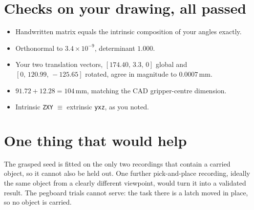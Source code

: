 \documentclass[10pt,a4paper]{article}
\begin{document}
\section{Checks on your drawing, all passed}
\begin{itemize}\itemsep0pt \parskip0pt 
\item Handwritten matrix equals the intrinsic composition of your angles exactly.
\item Orthonormal to $3.4\times10^{-9}$, determinant $1.000$.
\item Your two translation vectors, $[174.40,\,3.3,\,0]$ global and $[0,\,120.99,\,-125.65]$ rotated,
      agree in magnitude to $0.0007$\,mm.
\item $91.72 + 12.28 = 104$\,mm, matching the CAD gripper-centre dimension.
\item Intrinsic \texttt{ZXY} $\equiv$ extrinsic \texttt{yxz}, as you noted.
\end{itemize}

\section{One thing that would help}
The grasped seed is fitted on the only two recordings that contain a carried object, so it cannot
also be held out. One further pick-and-place recording, ideally the same object from a clearly
different viewpoint, would turn it into a validated result. The pegboard trials cannot serve: the
task there is a latch moved in place, so no object is carried.
\end{document}
